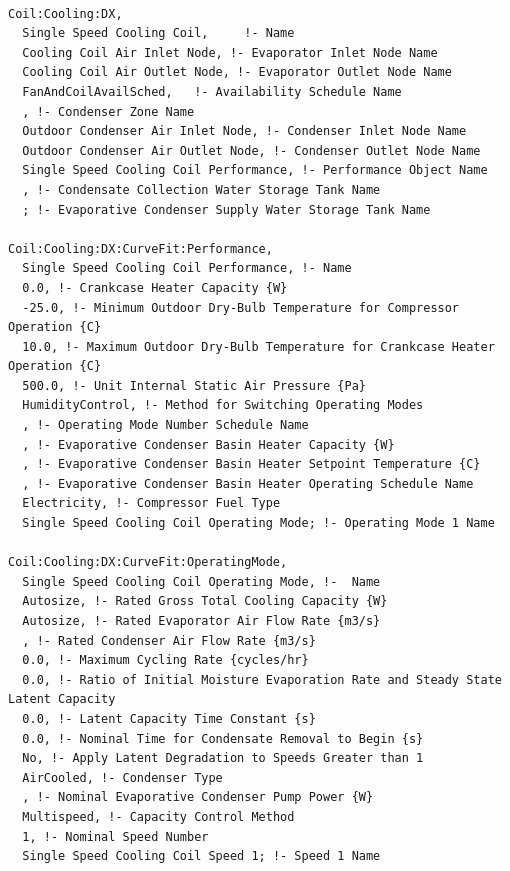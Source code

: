 \begin{lstlisting}

Coil:Cooling:DX,
  Single Speed Cooling Coil,     !- Name
  Cooling Coil Air Inlet Node, !- Evaporator Inlet Node Name
  Cooling Coil Air Outlet Node, !- Evaporator Outlet Node Name
  FanAndCoilAvailSched,   !- Availability Schedule Name
  , !- Condenser Zone Name
  Outdoor Condenser Air Inlet Node, !- Condenser Inlet Node Name
  Outdoor Condenser Air Outlet Node, !- Condenser Outlet Node Name
  Single Speed Cooling Coil Performance, !- Performance Object Name
  , !- Condensate Collection Water Storage Tank Name
  ; !- Evaporative Condenser Supply Water Storage Tank Name

Coil:Cooling:DX:CurveFit:Performance,
  Single Speed Cooling Coil Performance, !- Name
  0.0, !- Crankcase Heater Capacity {W}
  -25.0, !- Minimum Outdoor Dry-Bulb Temperature for Compressor Operation {C}
  10.0, !- Maximum Outdoor Dry-Bulb Temperature for Crankcase Heater Operation {C}
  500.0, !- Unit Internal Static Air Pressure {Pa}
  HumidityControl, !- Method for Switching Operating Modes
  , !- Operating Mode Number Schedule Name
  , !- Evaporative Condenser Basin Heater Capacity {W}
  , !- Evaporative Condenser Basin Heater Setpoint Temperature {C}
  , !- Evaporative Condenser Basin Heater Operating Schedule Name
  Electricity, !- Compressor Fuel Type
  Single Speed Cooling Coil Operating Mode; !- Operating Mode 1 Name

Coil:Cooling:DX:CurveFit:OperatingMode,
  Single Speed Cooling Coil Operating Mode, !-  Name
  Autosize, !- Rated Gross Total Cooling Capacity {W}
  Autosize, !- Rated Evaporator Air Flow Rate {m3/s}
  , !- Rated Condenser Air Flow Rate {m3/s}
  0.0, !- Maximum Cycling Rate {cycles/hr}
  0.0, !- Ratio of Initial Moisture Evaporation Rate and Steady State Latent Capacity
  0.0, !- Latent Capacity Time Constant {s}
  0.0, !- Nominal Time for Condensate Removal to Begin {s}
  No, !- Apply Latent Degradation to Speeds Greater than 1
  AirCooled, !- Condenser Type
  , !- Nominal Evaporative Condenser Pump Power {W}
  Multispeed, !- Capacity Control Method
  1, !- Nominal Speed Number
  Single Speed Cooling Coil Speed 1; !- Speed 1 Name


\end{lstlisting}

